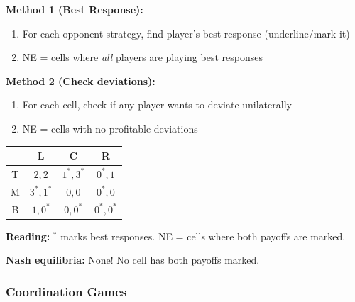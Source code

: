\begin{tipbox}
\textbf{Method 1 (Best Response):}
\begin{enumerate}
  \item For each opponent strategy, find player's best response (underline/mark it)
  \item NE = cells where \textit{all} players are playing best responses
\end{enumerate}

\textbf{Method 2 (Check deviations):}
\begin{enumerate}
  \item For each cell, check if any player wants to deviate unilaterally
  \item NE = cells with no profitable deviations
\end{enumerate}
\end{tipbox}

\begin{exbox}
\begin{center}
\renewcommand{\arraystretch}{1.2}
\begin{tabular}{@{} c | c c c @{}}
 & L & C & R \\
\midrule
T & $2, 2$ & $1^*, 3^*$ & $0^*, 1$ \\
M & $3^*, 1^*$ & $0, 0$ & $0^*, 0$ \\
B & $1, 0^*$ & $0, 0^*$ & $0^*, 0^*$ \\
\end{tabular}
\end{center}

\textbf{Reading:} $^*$ marks best responses. NE = cells where both payoffs are marked.

\textbf{Nash equilibria:} None! No cell has both payoffs marked.
\end{exbox}

\separator

\subsubsection{Coordination Games}


